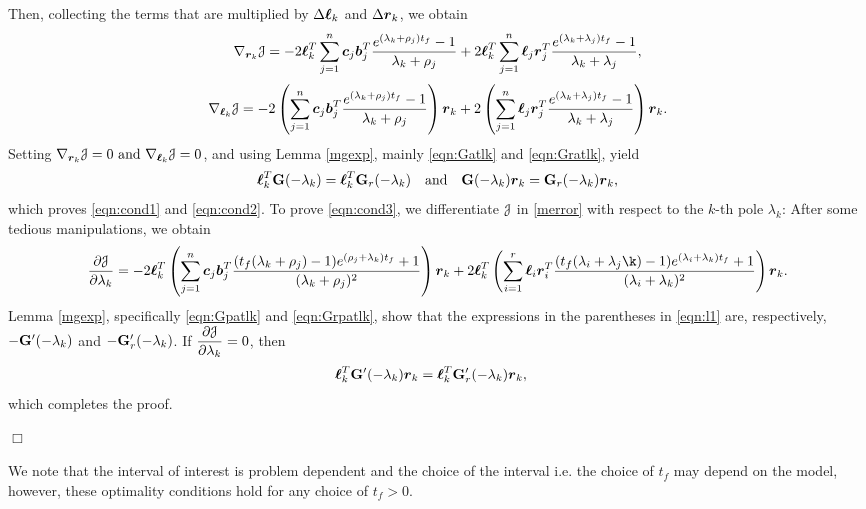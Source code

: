 \documentclass[twocolumn]{autart}
\begin{document}
Then, collecting  the terms that are multiplied by $\Delta\lc_{k}$ and $\Delta\rc_{k}$, we obtain 
\begin{dmath*}
\nabla_{\rc_{k} }\J =-2\lc_k^T\sum_{j=1}^n\cc_j\bb_j^T\dfrac{e^{(\lambda_k+\rho_j){\tf}}-1}{\lambda_k+\rho_j}+2\lc_k^T\sum_{j=1}^n\lc_j\rc_j^T\dfrac{e^{(\lambda_k+\lambda_j){\tf}}-1}{\lambda_k+\lambda_j},
\end{dmath*}
\begin{dmath*}
\nabla_{\lc_{k} }\J=-2\left (\sum_{j=1}^n\cc_j\bb_j^T\dfrac{e^{(\lambda_k+\rho_j){\tf}}-1}{\lambda_k+\rho_j}\right)\rc_k+2\left(\sum_{j=1}^n\lc_j\rc_j^T\dfrac{e^{(\lambda_k+\lambda_j){\tf}}-1}{\lambda_k+\lambda_j}\right)\rc_k.\\
\end{dmath*}
Setting $\nabla_{\rc_{k} }\J=0   \text{ and }\nabla_{\lc_{k} }\J=0 $, and using Lemma \ref{mgexp}, mainly
\eqref{eqn:Gatlk} and \eqref{eqn:Gratlk}, yield 
\begin{align*}
\lc_k^T\G(-\lambda_k)=\lc_k^T\G_r(-\lambda_k) \quad \mbox{and}\quad
\G(-\lambda_k)\rc_k=\G_r(-\lambda_k)\rc_k,
\end{align*}
which proves \eqref{eqn:cond1} and \eqref{eqn:cond2}. To prove \eqref{eqn:cond3},  we differentiate $\J$ in \eqref{merror}  with respect to the $k$-th pole $\lambda_k$: 
After some tedious manipulations, we obtain 
\begin{dmath}\label{eqn:l1} 
\pder[\J]{\lambda_k} =-2\lc_k^T \left(\sum_{j=1}^n \cc_j\bb_j^T \dfrac{({\tf}(\lambda_k+\rho_j)-1)e^{(\rho_j+\lambda_k){\tf}}+1}{(\lambda_k+\rho_j)^2}\right)\rc_k  
+2\lc_k^T \left(\sum^r_{i=1} \lc_i\rc_i^T\dfrac{({\tf}(\lambda_i+\lambda_j\k)-1)e^{(\lambda_i+\lambda_k){\tf}}+1}{(\lambda_i+\lambda_k)^2}\right)\rc_k.
\end{dmath}
Lemma \eqref{mgexp}, specifically \eqref{eqn:Gpatlk} and \eqref{eqn:Grpatlk}, show that the expressions in the parentheses in \eqref{eqn:l1}  are, respectively, $-\G'(-\lambda_k)$ and $-\G_r'(-\lambda_k)$.
If $\pder[\J]{\lambda_k}= 0$, then
\begin{align*}
\lc_k^T\G'(-\lambda_k)\rc_k&=\lc_k^T\G_r'(-\lambda_k)\rc_k,
\end{align*}
which completes the proof.
\begin{flushright} $\Box$  \end{flushright}
{\color{red} We note that the interval of interest is problem dependent and the choice of the interval i.e. the choice of $t_f$ may depend on the model, however, these optimality conditions hold for any choice of $t_f>0$.}
\end{document}
